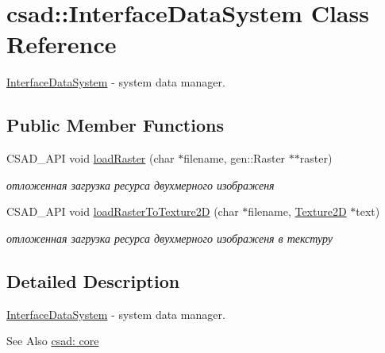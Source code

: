 \hypertarget{classcsad_1_1_interface_data_system}{\section{csad\-:\-:Interface\-Data\-System Class Reference}
\label{classcsad_1_1_interface_data_system}
}


\hyperlink{classcsad_1_1_interface_data_system}{Interface\-Data\-System} -\/ system data manager.  


\subsection*{Public Member Functions}
\begin{DoxyCompactItemize}
\item 
\hypertarget{classcsad_1_1_interface_data_system_a237a7ec3260d3fb4d67937e4eb940767}{C\-S\-A\-D\-\_\-\-A\-P\-I void \hyperlink{classcsad_1_1_interface_data_system_a237a7ec3260d3fb4d67937e4eb940767}{load\-Raster} (char $\ast$filename, gen\-::\-Raster $\ast$$\ast$raster)}\label{classcsad_1_1_interface_data_system_a237a7ec3260d3fb4d67937e4eb940767}

\begin{DoxyCompactList}\small\item\em отложенная загрузка ресурса двухмерного изображеня \end{DoxyCompactList}\item 
\hypertarget{classcsad_1_1_interface_data_system_a310d28ddebd9041062fdeed896426cfb}{C\-S\-A\-D\-\_\-\-A\-P\-I void \hyperlink{classcsad_1_1_interface_data_system_a310d28ddebd9041062fdeed896426cfb}{load\-Raster\-To\-Texture2\-D} (char $\ast$filename, \hyperlink{classcsad_1_1_texture2_d}{Texture2\-D} $\ast$text)}\label{classcsad_1_1_interface_data_system_a310d28ddebd9041062fdeed896426cfb}

\begin{DoxyCompactList}\small\item\em отложенная загрузка ресурса двухмерного изображеня в текстуру \end{DoxyCompactList}\end{DoxyCompactItemize}


\subsection{Detailed Description}
\hyperlink{classcsad_1_1_interface_data_system}{Interface\-Data\-System} -\/ system data manager. 

\begin{DoxySeeAlso}{See Also}
\hyperlink{group__core}{csad\-: core} 
\end{DoxySeeAlso}
